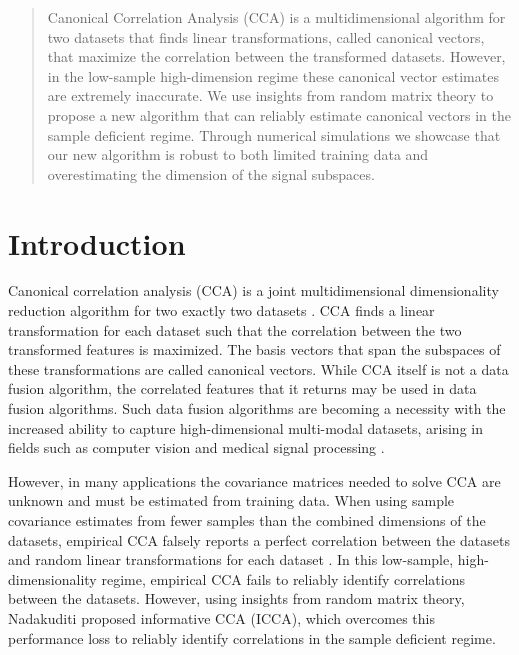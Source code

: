 \begin{abstract}
  Canonical Correlation Analysis (CCA) is a multidimensional algorithm for two datasets
  that finds linear transformations, called canonical vectors, that maximize the
  correlation between the transformed datasets. However, in the low-sample high-dimension
  regime these canonical vector estimates are extremely inaccurate. We use insights
  from random matrix theory to propose a new algorithm that can reliably estimate
  canonical vectors in the sample deficient regime. Through numerical simulations we
  showcase that our new algorithm is robust to both limited training data and
  overestimating the dimension of the signal subspaces.
\end{abstract}

\section{Introduction}
Canonical correlation analysis (CCA) is a joint multidimensional dimensionality reduction
algorithm for two exactly two datasets \cite{hotelling1936relations}. CCA finds a linear
transformation for each dataset such that the correlation between the two transformed
features is maximized. The basis vectors that span the subspaces of these transformations
are called canonical vectors. While CCA itself is not a data fusion algorithm, the
correlated features that it returns may be used in data fusion algorithms.  Such data
fusion algorithms are becoming a necessity with the increased ability to capture
high-dimensional multi-modal datasets, arising in fields such as computer vision
\cite{hardoon2004canonical, dhillon2011multi,hardoon2006correlation,chaudhuri2009multi} and
medical signal processing \cite{khalid2013improving, correa2010canonical,
  seoane2014canonical, spuler2013spatial}.

However, in many applications the covariance matrices needed to solve CCA are
unknown and must be estimated from training data. When using sample covariance
estimates from fewer samples than the combined dimensions of the datasets, empirical CCA
falsely reports a perfect correlation between the datasets and random linear
transformations for each dataset \cite{pezeshki2004empirical}. In this low-sample,
high-dimensionality regime, empirical CCA fails to reliably identify correlations between
the datasets. However, using insights from random matrix theory, Nadakuditi
\cite{nadakuditi2011fundamental} proposed informative CCA (ICCA), which overcomes this
performance loss to reliably identify correlations in the sample deficient regime.

